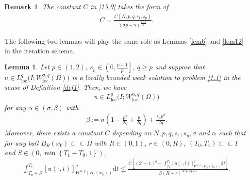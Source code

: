 \documentclass[reqno,10pt]{amsart}
\numberwithin{equation}{section}
\newtheorem{lemma}[theorem]{Lemma}
\newtheorem{remark}[theorem]{Remark}
\begin{document}
\begin{remark}
	\label{rem15.1}
	The constant $C$ in \eqref{15.0} takes the form of
	\begin{align*}
		C=\frac{C(N,p,q,s_1,s_p)}{(\sigma p-\gamma)^\frac{q-p}{q}}.
	\end{align*}
\end{remark}

The following two lemmas will play the same role as Lemmas \ref{lem6} and \ref{lem12} in the iteration scheme.

\begin{lemma}
	\label{lem18}
	Let $p\in(1,2)$, $s_p\in\left( 0,\frac{p-1}{p}\right]$, $q\ge p$ and suppose that $u\in L^q_{\mathrm{loc}}\bigl(I;W^{\sigma,q}_{\mathrm{loc}}(\Omega)\bigl)$ is a locally bounded weak solution to problem \eqref{1.1} in the sense of Definition \ref{def1}. Then, we have
	\begin{align*}
		u\in L^q_{\mathrm{loc}}\bigl(I;W^{\alpha,q}_{\mathrm{loc}}(\Omega)\bigl)
	\end{align*}
	for any $\alpha\in(\sigma,\beta)$ with
	\begin{align*}
		\beta:=\sigma\left(1-\frac{p^2}{2q}+\frac{p}{2q}\right)+\frac{s_pp^2}{2q}. 
	\end{align*}
	Moreover, there exists a constant $C$ depending on $N,p,q,s_1,s_p,\sigma$ and $\alpha$ such that for any ball $B_R(x_0)\subset\subset\Omega$ with $R\in(0,1)$, $r\in (0,R)$, $(T_0,T_1)\subset\subset I$ and $S\in \left( 0,\min\left\lbrace T_1-T_0,1\right\rbrace \right) $,
	\begin{align*}
		\int_{T_0+S}^{T_1}[u(\cdot,t)]^q_{W^{\alpha,q}\left( B_r(x_0)\right)}\mathrm{d}t\le\frac{C\left[\left(\mathcal{T}+1\right)^q+\int_{T_0}^{T_1}[u(\cdot,t)]^q_{W^{\sigma,q}\left( B_R(x_0)\right)}\mathrm{d}t\right]}{S(R-r)^{N+2q+1}}.
	\end{align*}
\end{lemma}
\end{document}
